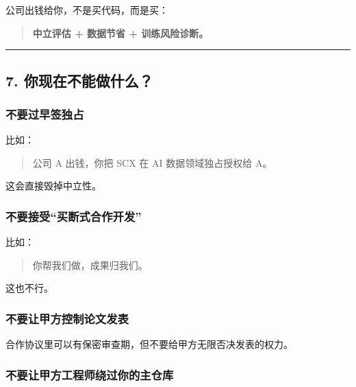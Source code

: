 \documentclass[
  12pt,
]{ctexart}
\begin{document}
公司出钱给你，不是买代码，而是买：

\begin{quote}
\textbf{中立评估 + 数据节省 + 训练风险诊断。}
\end{quote}

\begin{center}\rule{0.5\linewidth}{0.5pt}\end{center}

\subsection{7.
你现在不能做什么？}\label{ux4f60ux73b0ux5728ux4e0dux80fdux505aux4ec0ux4e48}

\subsubsection{不要过早签独占}\label{ux4e0dux8981ux8fc7ux65e9ux7b7eux72ecux5360}

比如：

\begin{quote}
公司 A 出钱，你把 SCX 在 AI 数据领域独占授权给 A。
\end{quote}

这会直接毁掉中立性。

\subsubsection{不要接受``买断式合作开发''}\label{ux4e0dux8981ux63a5ux53d7ux4e70ux65adux5f0fux5408ux4f5cux5f00ux53d1}

比如：

\begin{quote}
你帮我们做，成果归我们。
\end{quote}

这也不行。

\subsubsection{不要让甲方控制论文发表}\label{ux4e0dux8981ux8ba9ux7532ux65b9ux63a7ux5236ux8bbaux6587ux53d1ux8868}

合作协议里可以有保密审查期，但不要给甲方无限否决发表的权力。

\subsubsection{不要让甲方工程师绕过你的主仓库}\label{ux4e0dux8981ux8ba9ux7532ux65b9ux5de5ux7a0bux5e08ux7ed5ux8fc7ux4f60ux7684ux4e3bux4ed3ux5e93}
\end{document}
